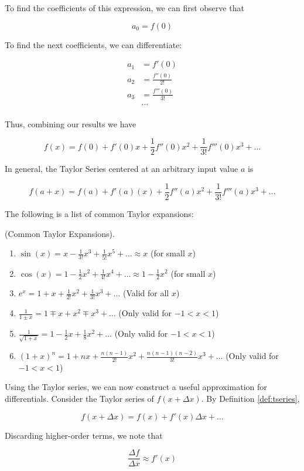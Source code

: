 \documentclass[openany,oneside]{book}
\begin{document}
To find the coefficients of this expression, we can first observe that

\[ 
    a_0 = f(0)
\]

To find the next coefficients, we can differentiate: 

\begin{align*}
    a_1 &= f'(0) \\
    a_2 &= \frac{f''(0)}{2!} \\
    a_3 &= \frac{f'''(0)}{3!} \\
        &\dots \\
\end{align*}

Thus, combining our results we have 

\[
    f(x) = f(0) + f'(0)x + \frac{1}{2}f''(0)x^2 + \frac{1}{3!}f'''(0)x^3 + \dots 
\]

In general, the Taylor Series centered at an arbitrary input value $a$ is 

\begin{definition}
    \label{def:tseries}
    \[
        f(a+x) = f(a) + f'(a)(x) + \frac{1}{2}f''(a)x^2 + \frac{1}{3!}f'''(a)x^3 + \dots 
        \]
    
\end{definition}

The following is a list of common Taylor expansions: 

\begin{theorem}
(Common Taylor Expansions). \
\begin{enumerate}
    \item $\sin(x) = x - \frac{1}{3!}x^3 + \frac{1}{5!}x^5 + \dots \approx x $ (for small $x$)
    \item $\cos(x) = 1 - \frac{1}{2}x^2 + \frac{1}{4!}x^4 + \dots \approx 1 - \frac{1}{2}x^2 $ (for small $x$)
    \item $e^{x} = 1 + x + \frac{1}{2!}x^2 + \frac{1}{3!}x^3 + \dots $ (Valid for all $x$) 
    \item $\frac{1}{1 \pm x} = 1 \mp x + x^2 \mp x^3 + \dots$ (Only valid for $-1 < x < 1$)
    \item $\frac{1}{\sqrt{1 + x}} = 1 - \frac{1}{2}x + \frac{1}{8}x^2 + \dots$ (Only valid for $-1 < x < 1$)
    \item $(1+x)^n = 1 + nx + \frac{n(n-1)}{2!} x^2 + \frac{n(n-1)(n-2)}{3!} x^3 + \dots$ (Only valid for $-1 < x < 1$) 
    

\end{enumerate}    
\end{theorem}

Using the Taylor series, we can now construct a useful approximation for differentials. 
Consider the Taylor series of $f(x+\Delta x)$. By Definition \ref{def:tseries}, 

\[
    f(x+\Delta x) = f(x) + f'(x)\Delta x + \dots
\]

Discarding higher-order terms, we note that 

\[
    \frac{\Delta f}{\Delta x} \approx f'(x)
\]






\end{document}
